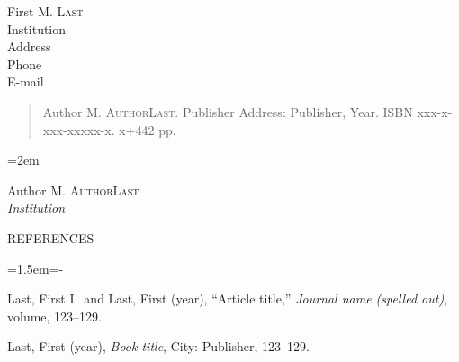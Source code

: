 \documentclass[12pt]{article}
\newenvironment{references}{
  \begin{center} \textsf{REFERENCES} \end{center}
  \begin{list}{}{\topsep=0pt\parsep=0pt\baselineskip=20pt
   \leftmargin=1.5em\itemindent=-\leftmargin}}
  {\end{list}}
\begin{document}
\noindent
First M.  \textsc{Last}\\
Institution\\
Address\\
Phone\\
E-mail\\
\medskip

\begin{quote}
Author M. \textsc{AuthorLast}.
Publisher Address: Publisher, Year. ISBN xxx-x-xxx-xxxxx-x. 
x+442 pp. 
\end{quote}

\thispagestyle{empty}
\raggedright\baselineskip=18pt\parindent=2em\parskip=5pt





\begin{flushright}\def\baselinestretch{1}
Author M.  \textsc{AuthorLast}\\
\emph{Institution}

\end{flushright}




\begin{references}

\item Last, First I.\ and Last, First (year), ``Article title,''
      \emph{Journal name (spelled out)}, volume, 123--129.

\item Last, First (year), \emph{Book title},
      City: Publisher, 123--129.


\end{references}


\end{document}
